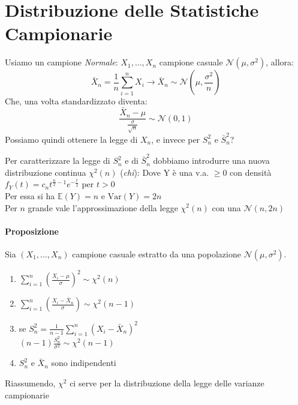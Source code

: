 \section{Distribuzione delle Statistiche Campionarie}
Usiamo un campione \emph{Normale}:
$X_1, ..., X_n$ campione casuale $\mathcal{N}(\mu, \sigma^2)$, allora:
\[
    \bar{X}_n = \frac{1}{n} \sum_{i=1}^n X_i \to \bar{X}_n \sim \mathcal{N}(\mu, \frac{\sigma^2}{n})
\]
Che, una volta standardizzato diventa:
\begin{equation*}
    \frac{\bar{X}_n-\mu}{\frac{\sigma}{\sqrt{n}}} \sim \mathcal{N}(0,1)
\end{equation*}
Possiamo quindi ottenere la legge di $X_n$, e invece per $S_{n}^2$ e $\bar{S}_{n}^2$?

Per caratterizzare la legge di $S_{n}^2$ e di $\bar{S}_{n}^2$ dobbiamo
introdurre una nuova distribuzione continua $\chi^2(n)$ (\emph{chi}):
Dove Y è una v.a. $\geq 0$ con densità $f_Y(t) = c_n t^{\frac{n}{2}-1} e^{-\frac{t}{2}} $ per $ t>0$
\\ Per essa si ha $\mathbb{E}(Y) = n$ e $\text{Var}(Y)=2n$
\\ Per $n$ grande vale l'approssimazione della legge $\chi^2(n)$ con una
$\mathcal{N}(n,2n)$
\paragraph*{Proposizione} Sia $(X_1, ..., X_n)$ campione casuale estratto
da una popolazione $\mathcal{N}(\mu, \sigma^2)$.
\begin{enumerate}
    \item $\sum_{i=1}^n(\frac{X_i-\mu}{\sigma})^2 \sim \chi^2(n)$
    \item $\sum_{i=1}^n(\frac{X_i-\bar{X}_n}{\sigma}) \sim \chi^2(n-1)$
    \item se $S_{n}^2 = \frac{1}{n-1}\sum_{i=1}^n(X_i - \bar{X}_n)^2$
    \\ $(n-1)\frac{S_{n}^2}{\sigma^2} \sim \chi^2(n-1)$
    \item $S_{n}^2$ e $\bar{X}_n$ sono indipendenti
\end{enumerate}
Riassumendo, $\chi^2$ ci serve per la distribuzione della legge delle varianze campionarie


